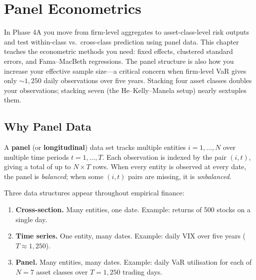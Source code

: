 \chapter{Panel Econometrics}
\label{ch:panel}

\begin{projectconnection}
In Phase 4A you move from firm-level aggregates to asset-class-level risk outputs and test within-class vs.\ cross-class prediction using panel data.
This chapter teaches the econometric methods you need: fixed effects, clustered standard errors, and Fama--MacBeth regressions.
The panel structure is also how you increase your effective sample size---a critical concern when firm-level VaR gives only ${\sim}1{,}250$ daily observations over five years.
Stacking four asset classes doubles your observations; stacking seven (the He--Kelly--Manela setup) nearly sextuples them.
\end{projectconnection}

\section{Why Panel Data}
\label{sec:panel-why}

\begin{definition}
A \textbf{panel} (or \textbf{longitudinal}) data set tracks multiple entities $i = 1, \dots, N$ over multiple time periods $t = 1, \dots, T$.
Each observation is indexed by the pair $(i, t)$, giving a total of up to $N \times T$ rows.
When every entity is observed at every date, the panel is \emph{balanced}; when some $(i,t)$ pairs are missing, it is \emph{unbalanced}.
\end{definition}

Three data structures appear throughout empirical finance:
\begin{enumerate}[leftmargin=*]
  \item \textbf{Cross-section.} Many entities, one date. Example: returns of 500 stocks on a single day.
  \item \textbf{Time series.} One entity, many dates. Example: daily VIX over five years ($T \approx 1{,}250$).
  \item \textbf{Panel.} Many entities, many dates. Example: daily VaR utilisation for each of $N = 7$ asset classes over $T = 1{,}250$ trading days.
\end{enumerate}

